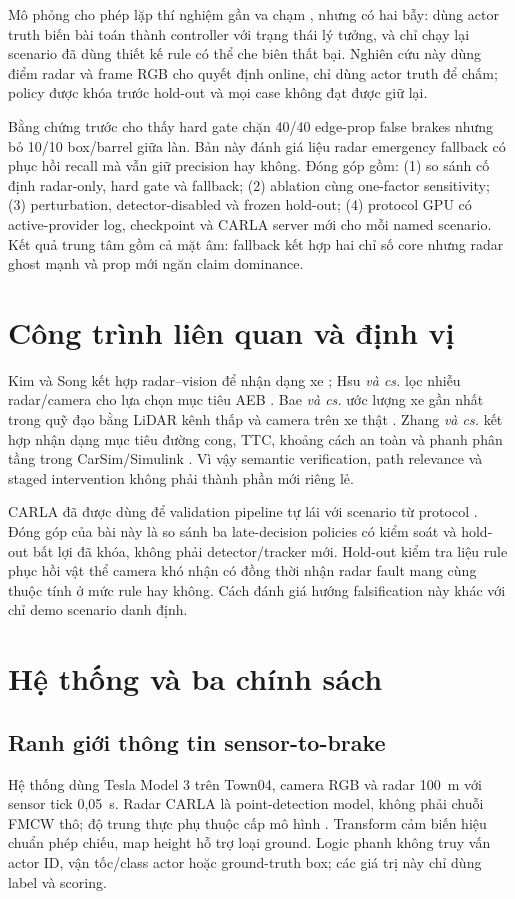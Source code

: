\documentclass[conference]{IEEEtran}
\begin{document}
Mô phỏng cho phép lặp thí nghiệm gần va chạm
\cite{dosovitskiy2017carla,kang2019testing}, nhưng có hai bẫy: dùng actor truth
biến bài toán thành controller với trạng thái lý tưởng, và chỉ chạy lại scenario
đã dùng thiết kế rule có thể che biên thất bại. Nghiên cứu này dùng điểm radar và
frame RGB cho quyết định online, chỉ dùng actor truth để chấm; policy được khóa
trước hold-out và mọi case không đạt được giữ lại.

Bằng chứng trước cho thấy hard gate chặn 40/40 edge-prop false brakes nhưng bỏ
10/10 box/barrel giữa làn. Bản này đánh giá liệu radar emergency fallback có
phục hồi recall mà vẫn giữ precision hay không. Đóng góp gồm: (1) so sánh cố
định radar-only, hard gate và fallback; (2) ablation cùng one-factor sensitivity;
(3) perturbation, detector-disabled và frozen hold-out; (4) protocol GPU có
active-provider log, checkpoint và CARLA server mới cho mỗi named scenario. Kết
quả trung tâm gồm cả mặt âm: fallback kết hợp hai chỉ số core nhưng radar ghost
mạnh và prop mới ngăn claim dominance.

\section{Công trình liên quan và định vị}
Kim và Song kết hợp radar--vision để nhận dạng xe \cite{kim2013vehicle}; Hsu
\emph{và cs.} lọc nhiễu radar/camera cho lựa chọn mục tiêu AEB
\cite{hsu2015noise}. Bae \emph{và cs.} ước lượng xe gần nhất trong quỹ đạo bằng
LiDAR kênh thấp và camera trên xe thật \cite{bae2021cipv}. Zhang \emph{và cs.}
kết hợp nhận dạng mục tiêu đường cong, TTC, khoảng cách an toàn và phanh phân
tầng trong CarSim/Simulink \cite{zhang2023curved}. Vì vậy semantic verification,
path relevance và staged intervention không phải thành phần mới riêng lẻ.

CARLA đã được dùng để validation pipeline tự lái với scenario từ protocol
\cite{gomez2022carla}. Đóng góp của bài này là so sánh ba late-decision policies
có kiểm soát và hold-out bất lợi đã khóa, không phải detector/tracker mới. Hold-out
kiểm tra liệu rule phục hồi vật thể camera khó nhận có đồng thời nhận radar fault
mang cùng thuộc tính ở mức rule hay không. Cách đánh giá hướng falsification này
khác với chỉ demo scenario danh định.

\section{Hệ thống và ba chính sách}
\subsection{Ranh giới thông tin sensor-to-brake}
Hệ thống dùng Tesla Model 3 trên Town04, camera RGB và radar 100~m với sensor
tick 0,05~s. Radar CARLA là point-detection model, không phải chuỗi FMCW thô;
độ trung thực phụ thuộc cấp mô hình \cite{magosi2022radar}. Transform cảm biến
hiệu chuẩn phép chiếu, map height hỗ trợ loại ground. Logic phanh không truy vấn
actor ID, vận tốc/class actor hoặc ground-truth box; các giá trị này chỉ dùng
label và scoring.
\end{document}
